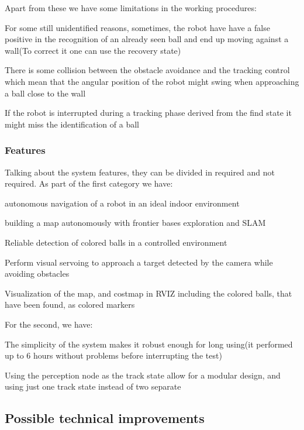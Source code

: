 Apart from these we have some limitations in the working procedures\+:
\begin{DoxyItemize}
\item For some still unidentified reasons, sometimes, the robot have have a false positive in the recognition of an already seen ball and end up moving against a wall(\+To correct it one can use the recovery state)
\item There is some collision between the obstacle avoidance and the tracking control which mean that the angular position of the robot might swing when approaching a ball close to the wall
\item If the robot is interrupted during a tracking phase derived from the find state it might miss the identification of a ball
\end{DoxyItemize}

\subsubsection*{Features}

Talking about the system features, they can be divided in required and not required. As part of the first category we have\+:
\begin{DoxyItemize}
\item autonomous navigation of a robot in an ideal indoor environment
\item building a map autonomously with frontier bases exploration and S\+L\+AM
\item Reliable detection of colored balls in a controlled environment
\item Perform visual servoing to approach a target detected by the camera while avoiding obstacles
\item Visualization of the map, and costmap in R\+V\+IZ including the colored balls, that have been found, as colored markers
\end{DoxyItemize}

For the second, we have\+:
\begin{DoxyItemize}
\item The simplicity of the system makes it robust enough for long using(it performed up to 6 hours without problems before interrupting the test)
\item Using the perception node as the track state allow for a modular design, and using just one track state instead of two separate
\end{DoxyItemize}

\subsection*{Possible technical improvements}


